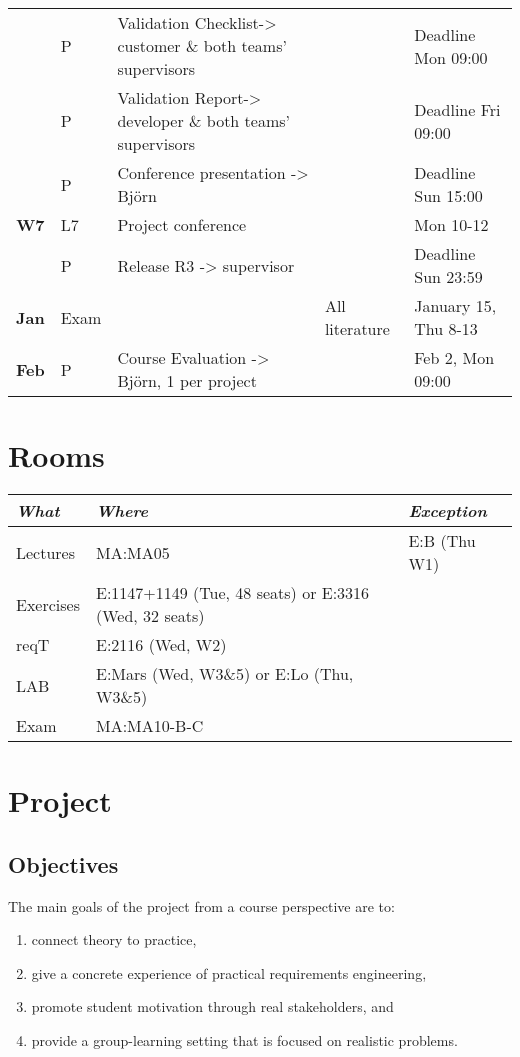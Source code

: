 \documentclass[10pt,a4paper]{article}
\begin{document}
\begin{flushleft}
\begin{tabular}{c | p{0.5cm} p{4.4cm} p{2.2cm}  p{3.2cm}}
 & P &  \multirow{1}{*}{\footnotesize Validation Checklist-> customer \& both teams' supervisors} & & Deadline Mon  09:00  \\ & P &  \multirow{1}{*}{\footnotesize Validation Report-> developer \& both teams' supervisors} & & Deadline Fri  09:00  \\
 & P & Conference presentation -> Björn& & Deadline Sun  15:00  \\
\hline
\multirow{1}{*}{{\bfseries\sffamily W7}} 
 & L7 & Project conference &  & Mon 10-12\\
 & P & Release R3 -> supervisor & & Deadline Sun 23:59\\
  \hline
\multirow{1}{*}{{\bfseries\sffamily Jan }} 
  & Exam & &All literature  & January 15, Thu 8-13 \\
\multirow{1}{*}{{\bfseries\sffamily Feb }}   
  &  P & \multirow{1}{*}{Course Evaluation -> Björn, 1 per project} & & Feb 2, Mon 09:00\\

\hline
\end{tabular} 
\end{flushleft}

\section{Rooms}
\begin{flushleft}
\small
\begin{tabular}{l | l | l} 
{\it What} & {\it Where} & {\it Exception} \\
\hline
Lectures & MA:MA05 & E:B (Thu W1)  \\
Exercises & E:1147+1149 (Tue, 48 seats) or E:3316 (Wed, 32 seats)   \\
reqT & E:2116 (Wed, W2)   \\
LAB & E:Mars (Wed, W3\&5) or E:Lo (Thu, W3\&5)\\
Exam & MA:MA10-B-C \\
\end{tabular}
\end{flushleft}
\newpage
\section{Project}
\subsection{Objectives}
The main goals of the project from a course perspective are to:
\begin{enumerate}[noitemsep]
\item connect theory to practice,
\item give a concrete experience of practical requirements engineering,
\item promote student motivation through real stakeholders, and
\item provide a group-learning setting that is focused on realistic problems.
\end{enumerate}
\end{document}

